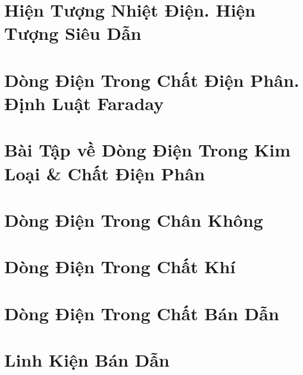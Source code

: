 \documentclass[oneside]{book}
\numberwithin{equation}{section}
\begin{document}

\section{Hiện Tượng Nhiệt Điện. Hiện Tượng Siêu Dẫn}


\section{Dòng Điện Trong Chất Điện Phân. Định Luật Faraday}


\section{Bài Tập về Dòng Điện Trong Kim Loại \& Chất Điện Phân}


\section{Dòng Điện Trong Chân Không}


\section{Dòng Điện Trong Chất Khí}


\section{Dòng Điện Trong Chất Bán Dẫn}


\section{Linh Kiện Bán Dẫn}

\end{document}
